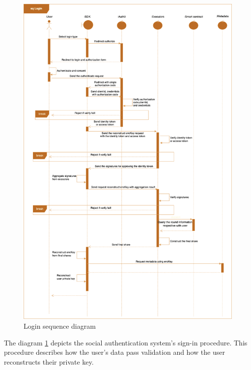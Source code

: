 \documentclass[../Main.tex]{subfiles}
\begin{document}
\begin{figure}[H]
 \centering
 \includegraphics[scale=0.14]{Figure/login-sequence-diagram.png}
 \caption{Login sequence diagram}
    \label{fig:Login-sequence-diagram}
\end{figure}
The diagram \ref{fig:Login-sequence-diagram} depicts the social authentication system's sign-in procedure. This procedure describes how the user's data pass validation and how the user reconstructs their private key.
\end{document}
